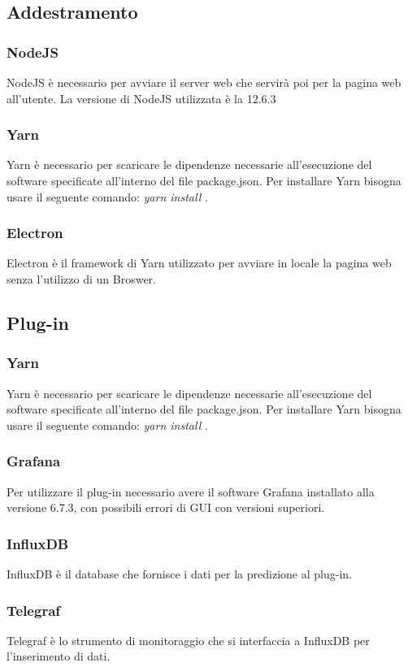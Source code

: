 \documentclass[../manuale-sviluppatore.tex]{subfiles}
\begin{document}
\subsection{Addestramento}%
\label{subs:addestramento}

\subsubsection{NodeJS}
\label{sssec:nodejs}
     NodeJS è necessario per avviare il server web che servirà poi per la pagina web all'utente. La versione di NodeJS utilizzata è la 12.6.3 

\subsubsection{Yarn}
\label{sssec:yarn}
    Yarn è necessario per scaricare le dipendenze necessarie all'esecuzione del software specificate all'interno del file package.json. Per installare Yarn bisogna usare il seguente comando: \emph{yarn install} .
    
\subsubsection{Electron}
\label{sssec:electron}
    Electron è il framework di Yarn utilizzato per avviare in locale la pagina web senza l'utilizzo di un Broswer.
     
\subsection{Plug-in}%
\label{subs:plug_in}

\subsubsection{Yarn}
\label{sssec:yarn}
    Yarn è necessario per scaricare le dipendenze necessarie all'esecuzione del software specificate all'interno del file package.json. Per installare Yarn bisogna usare il seguente comando: \emph{yarn install} .
    
\subsubsection{Grafana}
\label{sssec:grafana}
    Per utilizzare il plug-in necessario avere il software Grafana installato alla versione 6.7.3, con possibili errori di GUI con versioni superiori.
    
\subsubsection{InfluxDB}
\label{sssec:influxdb}
    InfluxDB è il database che fornisce i dati per la predizione al plug-in.
    
\subsubsection{Telegraf}
\label{sssec:telegraf}
    Telegraf è lo strumento di monitoraggio che si interfaccia a InfluxDB per l'inserimento di dati.
\end{document}
